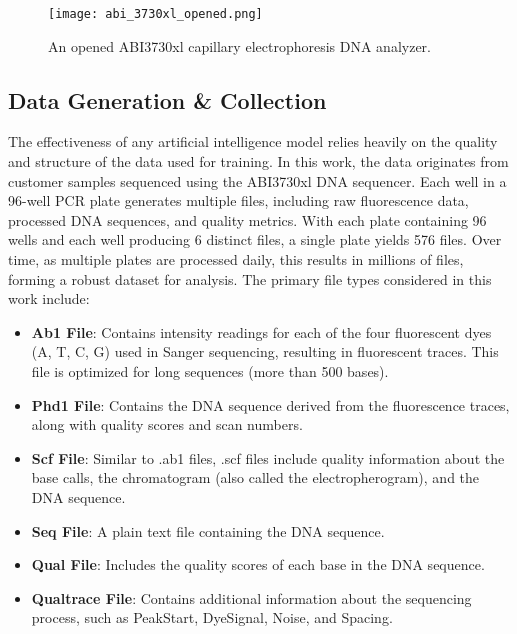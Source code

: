 \begin{figure}[h]
\centering
\texttt{[image: abi\_3730xl\_opened.png]}
\caption{An opened ABI3730xl capillary electrophoresis DNA analyzer.}
\label{fig:abi_3730xl_opened}
\end{figure}

\subsection{Data Generation \& Collection}

The effectiveness of any artificial intelligence model relies heavily on the quality and structure of the data used for training. In this work, the data originates from customer samples sequenced using the ABI3730xl DNA sequencer. Each well in a 96-well PCR plate generates multiple files, including raw fluorescence data, processed DNA sequences, and quality metrics. With each plate containing 96 wells and each well producing 6 distinct files, a single plate yields 576 files. Over time, as multiple plates are processed daily, this results in millions of files, forming a robust dataset for analysis.
The primary file types considered in this work include:

\begin{itemize}
  \item \textbf{Ab1 File}: Contains intensity readings for each of the four fluorescent dyes (A, T, C, G) used in Sanger sequencing, resulting in fluorescent traces. This file is optimized for long sequences (more than 500 bases).
  \item \textbf{Phd1 File}: Contains the DNA sequence derived from the fluorescence traces, along with quality scores and scan numbers.
  \item \textbf{Scf File}: Similar to .ab1 files, .scf files include quality information about the base calls, the chromatogram (also called the electropherogram), and the DNA sequence.
  \item \textbf{Seq File}: A plain text file containing the DNA sequence.
  \item \textbf{Qual File}: Includes the quality scores of each base in the DNA sequence.
  \item \textbf{Qualtrace File}: Contains additional information about the sequencing process, such as PeakStart, DyeSignal, Noise, and Spacing.
\end{itemize}

